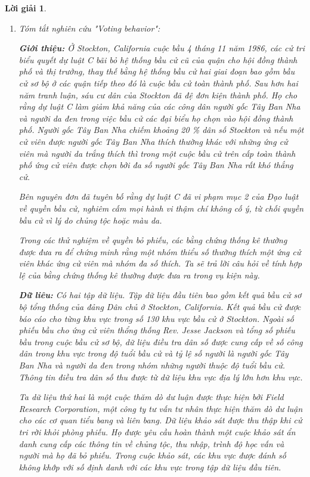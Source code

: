 \documentclass[14pt, a4paper]{article}
\theoremstyle{sltheorem}
\theoremstyle{soltheorem}
\newtheorem*{loigiai}{Lời giải}
\begin{document}
\begin{loigiai}
    \begin{enumerate}
        \item Tóm tắt nghiên cứu "Voting behavior":
        
        \textbf{Giới thiệu:}
        Ở Stockton, California cuộc bầu 4 tháng 11 năm 1986, các cử tri biểu quyết dự luật C bãi bỏ hệ thống bầu cử cũ của quận cho hội đồng thành phố và thị trưởng, thay thế bằng hệ thống bầu cử hai giai đoạn bao gồm bầu cử sơ bộ ở các quận tiếp theo đó là cuộc bầu cử toàn thành phố.
        Sau hơn hai năm tranh luận, sáu cư dân của Stockton đã đệ đơn kiện thành phố.
        Họ cho rằng dự luật C làm giảm khả năng của các công dân người gốc Tây Ban Nha và người da đen trong việc bầu cử các đại biểu họ chọn vào hội đồng thành phố.
        Người gốc Tây Ban Nha chiếm khoảng 20 \% dân số Stockton và nếu một cử viên được người gốc Tây Ban Nha thích thường khác với những ứng cử viên mà người da trắng thích thì trong một cuộc bầu cử trên cấp toàn thành phố ứng cử viên được chọn bởi đa số người gốc Tây Ban Nha rất khó thắng cử.

        Bên nguyên đơn đã tuyên bố rằng dự luật C đã vi phạm mục 2 của Đạo luật về quyền bầu cử, nghiêm cấm mọi hành vi thậm chí không cố ý, từ chối quyền bầu cử vì lý do chủng tộc hoặc màu da.

        Trong các thử nghiệm về quyền bỏ phiếu, các bằng chứng thống kê thường được đưa ra để chứng minh rằng một nhóm thiểu số thường thích một ứng cử viên khác ứng cử viên mà nhóm đa số thích.
        Ta sẽ trả lời câu hỏi về tính hợp lệ của bằng chứng thống kê thường được đưa ra trong vụ kiện này.

        \textbf{Dữ liêu:}
        Có hai tập dữ liệu.
        Tập dữ liệu đầu tiên bao gồm kết quả bầu cử sơ bộ tổng thống của đảng Dân chủ ở Stockton, California.
        Kết quả bầu cử được báo cáo cho từng khu vực trong số 130 khu vực bầu cử ở Stockton.
        Ngoài số phiếu bầu cho ứng cử viên thổng thống Rev. Jesse Jackson và tổng số phiếu bầu trong cuộc bầu cử sơ bộ, dữ liệu điều tra dân số được cung cấp về số công dân trong khu vực trong độ tuổi bầu cử và tỷ lệ số người là người gốc Tây Ban Nha và người da đen trong nhóm những người thuộc độ tuổi bầu cử.
        Thông tin điều tra dân số thu được từ dữ liệu khu vực địa lý lớn hơn khu vực.

        Ta dữ liệu thứ hai là một cuộc thăm dò dư luận được thực hiện bởi Field Research Corporation, một công ty tư vấn tư nhân thực hiện thăm dò dư luận cho các cơ quan tiểu bang và liên bang.
        Dữ liệu khảo sát được thu thập khi cử tri rời khỏi phòng phiếu.
        Họ được yêu cầu hoàn thành một cuộc khảo sát ẩn danh cung cấp các thông tin về chủng tộc, thu nhập, trình độ học vấn và người mà họ đã bỏ phiếu.
        Trong cuộc khảo sát, các khu vực được đánh số không khớp với số định danh với các khu vực trong tập dữ liệu đầu tiên.


\end{enumerate}
\end{loigiai}
\end{document}
